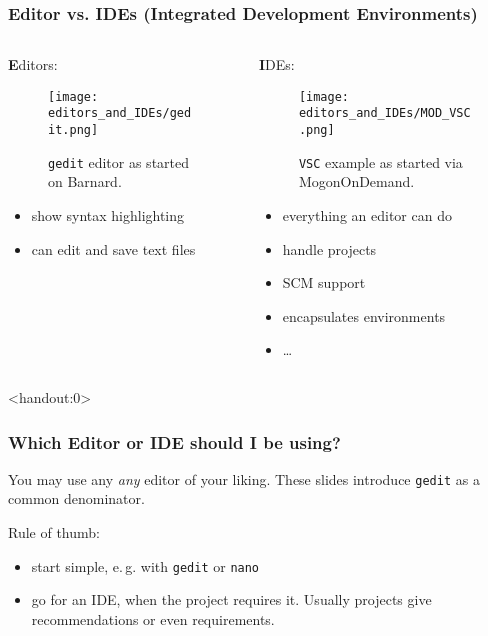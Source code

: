 \begin{frame}
  \frametitle{Editor vs. IDEs (Integrated Development Environments)}
  \footnotesize
  \begin{columns}[t]
  	\begin{column}{.5\textwidth}
  	  {\normalsize\textbf Editors:}
  	  \begin{figure}[t]
  		 \texttt{[image: editors\_and\_IDEs/gedit.png]}
  		 \caption*{\texttt{gedit} editor as started on Barnard.}
  	  \end{figure}
      \vfill
  	  \begin{itemize}
  	  	\item show syntax highlighting
  	  	\item can edit and save text files
  	  \end{itemize}  
  	\end{column}
  	\begin{column}{.5\textwidth}
  	  {\normalsize\textbf IDEs:}
  	  \begin{figure}[t]
  	  	\texttt{[image: editors\_and\_IDEs/MOD\_VSC.png]}
  		\caption*{\texttt{VSC} example as started via MogonOnDemand.}
  	  \end{figure}
      \vfill
      \begin{itemize}
         \item everything an editor can do
         \item handle projects
         \item SCM support
         \item encapsulates environments
         \item \ldots
      \end{itemize}  
  	\end{column}
  \end{columns}
\end{frame}

\begin{frame}<handout:0>
  \frametitle{Which Editor or IDE should I be using?}
  \begin{hint}
     You may use any \emph{any} editor of your liking. These slides introduce \texttt{gedit} as a common denominator.
  \end{hint}
  Rule of thumb:
  \begin{itemize}[<+->]
  	\item start simple, e.\,g. with \texttt{gedit} or \texttt{nano}
  	\item go for an IDE, when the project requires it. Usually projects give recommendations or even requirements.
  \end{itemize}
\end{frame} 

